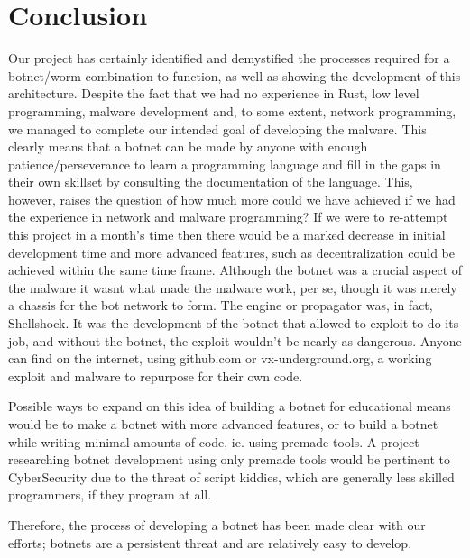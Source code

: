 \documentclass[../main.tex]{subfiles}
\begin{document}
	\chapter*{Conclusion}


    Our project has certainly identified and demystified the processes required for a botnet/worm combination to function, as well as showing the development of this architecture. 
    Despite the fact that we had no experience in Rust, low level programming, malware development and, to some extent, network programming, we managed to complete our intended goal of developing the malware.
    This clearly means that a botnet can be made by anyone with enough patience/perseverance to learn a programming language and fill in the gaps in their own skillset by consulting the documentation of the language.
    This, however, raises the question of how much more could we have achieved if we had the experience in network and malware programming?
    If we were to re-attempt this project in a month's time then there would be a marked decrease in initial development time and more advanced features, such as decentralization could be achieved within the same time frame.
    Although the botnet was a crucial aspect of the malware it wasnt what made the malware work, per se, though it was merely a chassis for the bot network to form. 
    The engine or propagator was, in fact, Shellshock.
    It was the development of the botnet that allowed to exploit to do its job, and without the botnet, the exploit wouldn't be nearly as dangerous.
    Anyone can find on the internet, using github.com or vx-underground.org, a working exploit and malware to repurpose for their own code.

    Possible ways to expand on this idea of building a botnet for educational means would be to make a botnet with more advanced features, or to build a botnet while writing minimal amounts of code, ie. using premade tools.
    A project researching botnet development using only premade tools would be pertinent to CyberSecurity due to the threat of script kiddies, which are generally less skilled programmers, if they program at all.

    Therefore, the process of developing a botnet has been made clear with our efforts; botnets are a persistent threat and are relatively easy to develop.

	\vspace{10pt}
\end{document}
